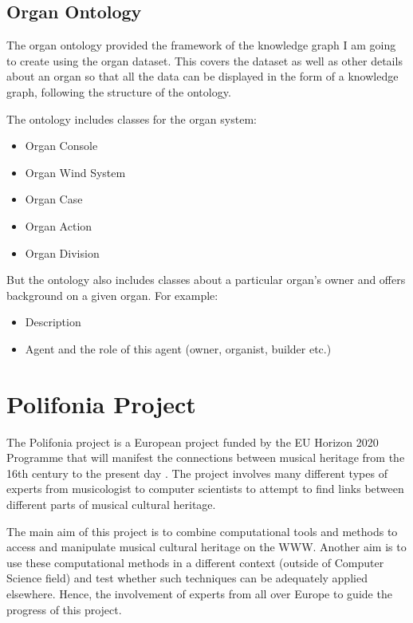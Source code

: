 \subsection{Organ Ontology}
\hspace{0.5cm} The organ ontology provided the framework of the knowledge graph I am going to create using the organ dataset. This covers the dataset as well as other details about an organ so that all the data can be displayed in the form of a knowledge graph, following the structure of the ontology. 

The ontology includes classes for the organ system:
\begin{itemize}
\item Organ Console
\item Organ Wind System
\item Organ Case
\item Organ Action
\item Organ Division
\end{itemize}

But the ontology also includes classes about a particular organ's owner and offers background on a given organ. For example:
\begin{itemize}
\item Description
\item Agent and the role of this agent (owner, organist, builder etc.)
\end{itemize}

\section{Polifonia Project}
\hspace{0.5cm} The Polifonia project is a European project funded by the EU Horizon 2020 Programme that will manifest the connections between musical heritage from the 16th century to the present day \cite{polifonia}. The project involves many different types of experts from musicologist to computer scientists to attempt to find links between different parts of musical cultural heritage. 

The main aim of this project is to combine computational tools and methods to access and manipulate musical cultural heritage on the WWW. Another aim is to use these computational methods in a different context (outside of Computer Science field) and test whether such techniques can be adequately applied elsewhere. Hence, the involvement of experts from all over Europe to guide the progress of this project. \cite{polifoniaproject}

